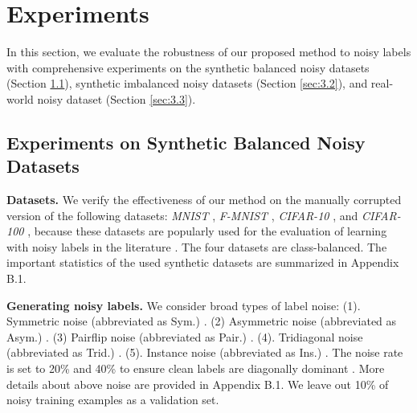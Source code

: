 \documentclass[11pt]{article}
\begin{document}
\section{Experiments}\label{sec:3}
In this section, we evaluate the robustness of our proposed method to noisy labels with comprehensive experiments on the synthetic balanced noisy datasets (Section \ref{sec:3.1}), synthetic imbalanced noisy datasets (Section \ref{sec:3.2}), and real-world noisy dataset (Section \ref{sec:3.3}).

\subsection{Experiments on Synthetic Balanced Noisy Datasets}\label{sec:3.1}
\vspace{-5pt}
\textbf{Datasets.} We verify the effectiveness of our method on the manually corrupted version of the following datasets: \textit{MNIST} \citep{LeCunmnist}, \textit{F-MNIST} \citep{xiao2017fashion}, \textit{CIFAR-10} \citep{krizhevsky2009learning}, and \textit{CIFAR-100} \citep{krizhevsky2009learning}, because these datasets are popularly used for the evaluation of learning with noisy labels in the literature \citep{han2018co,yu2019does,wu2020class2simi,lee2019robust}. The four datasets are class-balanced. The important statistics of the used synthetic datasets are summarized in Appendix B.1.

\textbf{Generating noisy labels.}  We consider broad types of label noise: (1). Symmetric noise (abbreviated as Sym.) \citep{wu2020topological,ma2018dimensionality,li2021provably}. (2) Asymmetric noise (abbreviated as Asym.) \citep{ma2020normalized,xia2021robust,wei2020combating}. (3) Pairflip noise (abbreviated as Pair.) \citep{han2018co,yu2019does,zheng2020error}. (4). Tridiagonal noise (abbreviated as Trid.) \citep{zhang2021learning}. (5). Instance noise (abbreviated as Ins.) \citep{cheng2017learning,xia2020part}. The noise rate is set to 20\% and 40\% to ensure clean labels are diagonally dominant \citep{ma2020normalized}. More details about above noise are provided in Appendix B.1. We leave out 10\% of noisy training examples as a validation set.
\end{document}
